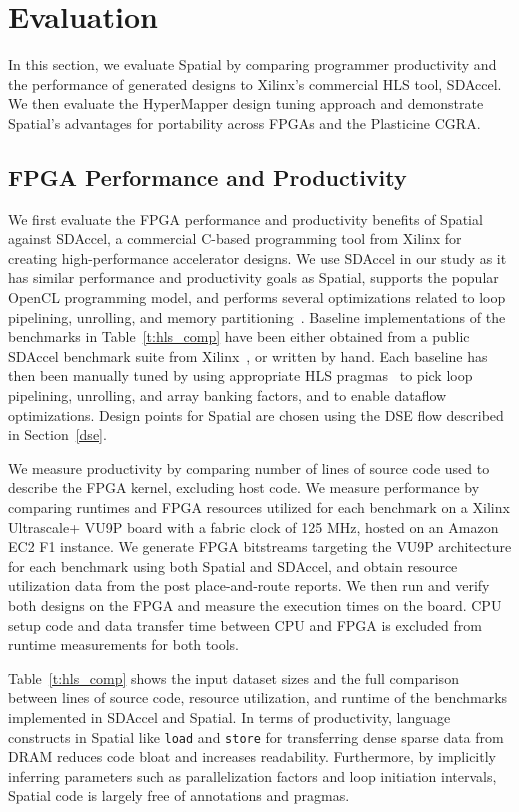 \section{Evaluation}
\label{spatial-evaluation}

In this section, we evaluate Spatial by comparing programmer productivity and the performance of generated designs to Xilinx's commercial HLS tool, SDAccel. We then evaluate the HyperMapper design tuning approach and demonstrate Spatial's advantages for portability across FPGAs and the Plasticine CGRA.

\subsection{FPGA Performance and Productivity}
We first evaluate the FPGA performance and productivity benefits of Spatial against SDAccel, a commercial C-based programming tool from Xilinx for creating high-performance accelerator designs. We use SDAccel in our study as it has similar performance and productivity goals as Spatial, supports the popular OpenCL programming model, and performs several optimizations related to loop pipelining, unrolling, and memory partitioning~\cite{sdaccel}. Baseline implementations of the benchmarks in Table~\ref{t:hls_comp} have been either obtained from a public SDAccel benchmark suite from Xilinx~\cite{sdaccelBench}, or written by hand. Each baseline has then been manually tuned by using appropriate HLS pragmas~\cite{hlsPragmaRef} to pick loop pipelining, unrolling, and array banking factors, and to enable dataflow optimizations. Design points for Spatial are chosen using the DSE flow described in Section~\ref{dse}.

We measure productivity by comparing number of lines of source code used to describe the FPGA kernel, excluding host code. We measure performance by comparing runtimes and FPGA resources utilized for each benchmark on a Xilinx Ultrascale+ VU9P board with a fabric clock of 125 MHz, hosted on an Amazon EC2 F1 instance. We generate FPGA bitstreams targeting the VU9P architecture for each benchmark using both Spatial and SDAccel, and obtain resource utilization data from the post place-and-route reports. We then run and verify both designs on the FPGA and measure the execution times on the board. CPU setup code and data transfer time between CPU and FPGA is excluded from runtime measurements for both tools.

Table~\ref{t:hls_comp} shows the input dataset sizes and the full comparison between lines of source code, resource utilization, and runtime of the benchmarks implemented in SDAccel and Spatial.
In terms of productivity, language constructs in Spatial like \texttt{\small{load}} and \texttt{\small{store}} for transferring dense sparse data from DRAM reduces code bloat and increases readability.
Furthermore, by implicitly
inferring parameters such as parallelization factors and loop initiation intervals, Spatial code is largely free of annotations and pragmas.

